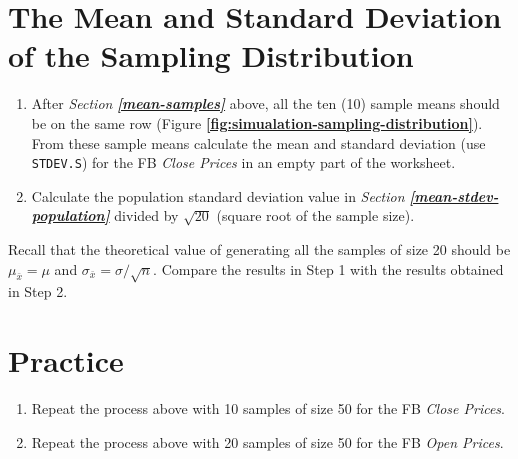 \documentclass[
]{book}
\providecommand{\tightlist}{%
  \setlength{\itemsep}{0pt}\setlength{\parskip}{0pt}}
\begin{document}
\hypertarget{the-mean-and-standard-deviation-of-the-sampling-distribution}{%
\section{The Mean and Standard Deviation of the Sampling Distribution}\label{the-mean-and-standard-deviation-of-the-sampling-distribution}}

\begin{enumerate}
\def\labelenumi{\arabic{enumi}.}
\item
  After \emph{Section} \textbf{\emph{\ref{mean-samples}}} above, all the ten (10) sample means should be on the same row (Figure \textbf{\ref{fig:simualation-sampling-distribution}}). From these sample means calculate the mean and standard deviation (use \texttt{STDEV.S}) for the FB \emph{Close Prices} in an empty part of the worksheet.
\item
  Calculate the population standard deviation value in \emph{Section} \textbf{\emph{\ref{mean-stdev-population}}} divided by \(\sqrt{20}\) (square root of the sample size).
\end{enumerate}

Recall that the theoretical value of generating all the samples of size 20 should be \(\mu_{\bar{x}}=\mu\) and \(\sigma_{\bar{x}}=\sigma/\sqrt{n}\). Compare the results in Step 1 with the results obtained in Step 2.

\hypertarget{practice-10}{%
\section{Practice}\label{practice-10}}

\begin{enumerate}
\def\labelenumi{\arabic{enumi}.}
\tightlist
\item
  Repeat the process above with 10 samples of size 50 for the FB \emph{Close Prices}.
\item
  Repeat the process above with 20 samples of size 50 for the FB \emph{Open Prices}.
\end{enumerate}

  
\end{document}
